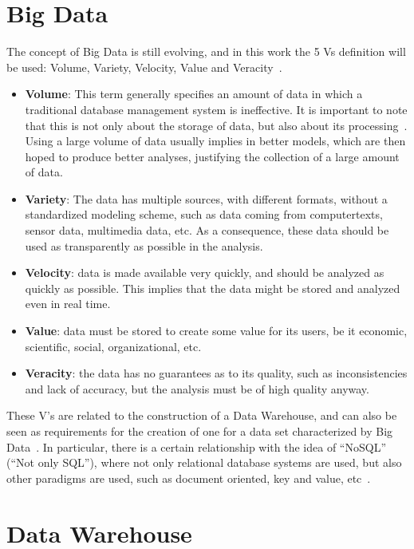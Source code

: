 \section{Big Data}\label{ch:fun:bigdata}

The concept of Big Data is still evolving, and in this work the 5 Vs definition will be used: Volume, Variety, Velocity, Value and Veracity~\cite{kacfahemaniUnderstandableBigData2015}.

\begin{itemize}[noitemsep]
  \item \textbf{Volume}: This term generally specifies an amount of data in which a traditional database management system is ineffective.
  It is important to note that this is not only about the storage of data, but also about its processing~\cite{boussoufBigDataBased2018}.
  Using a large volume of data usually implies in better models, which are then hoped to produce better analyses, justifying the collection of a large amount of data.
  \item \textbf{Variety}: The data has multiple sources, with different formats, without a standardized modeling scheme, such as data coming from computertexts, sensor data, multimedia data, etc.
  As a consequence, these data should be used as transparently as possible in the analysis.
  \item \textbf{Velocity}: data is made available very quickly, and should be analyzed as quickly as possible.
  This implies that the data might be stored and analyzed even in real time.
  \item \textbf{Value}: data must be stored to create some value for its users, be it economic, scientific, social, organizational, etc.
  \item \textbf{Veracity}: the data has no guarantees as to its quality, such as inconsistencies and lack of accuracy, but the analysis must be of high quality anyway.
\end{itemize}

These V's are related to the construction of a Data Warehouse, and can also be seen as requirements for the creation of one for a data set characterized by Big Data~\cite{zhangBigDataFramework2017}.
In particular, there is a certain relationship with the idea of ``NoSQL'' (``Not only SQL''), where not only relational database systems are used, but also other paradigms are used, such as document oriented, key and value, etc~\cite{bimonteOpenIssuesBig2016}.

\section{Data Warehouse}\label{ch:fun:dw}

